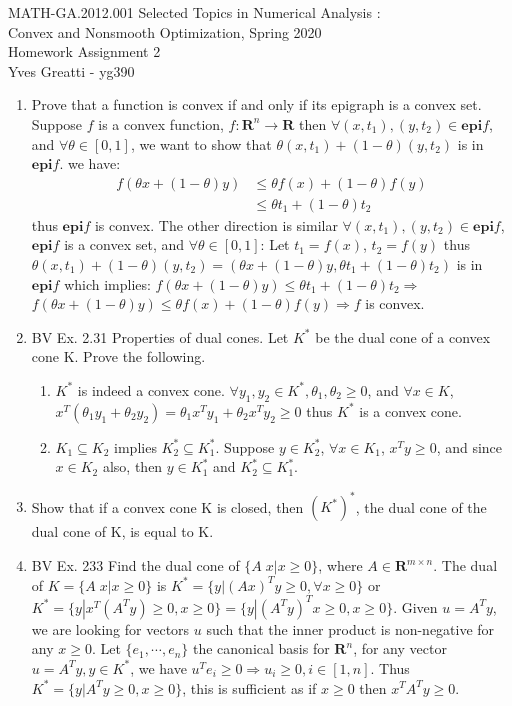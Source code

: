 \documentclass[10pt]{article}
\newcommand{\be}{\begin{enumerate}}
\newcommand{\ee}{\end{enumerate}}
\newcommand{\0}{\mat{0}}
\newcommand{\epi}{\textbf{epi}}
\begin{document}
\noindent MATH-GA.2012.001 Selected Topics in Numerical Analysis :\\
Convex and Nonsmooth Optimization, Spring 2020\\
Homework Assignment 2 \\
Yves Greatti - yg390\\

\begin{enumerate}

\item Prove that a function is convex if and only if its epigraph is a convex set. 
Suppose $f$ is a convex function, $f: \mathbf{R}^n \rightarrow \mathbf{R}$ then $\forall (x, t_1),(y, t_2) \in \epi f$, and $\forall  \theta \in [0, 1]$,
we want to show that $\theta (x, t_1) + (1-\theta) (y, t_2)$ is in $\epi f$.
we have:
\begin{align*}
	f(\theta x + (1-\theta) y)	&\le	\theta f(x) + (1 - \theta) f(y) \\
						&\le	\theta t_1 + (1 - \theta) t_2
\end{align*} thus $\epi f$ is convex. The other direction is similar  $\forall (x, t_1),(y, t_2) \in \epi f$, $\epi f$ is a convex set, and $\forall  \theta \in [0, 1]$:
Let $t_1 = f(x)$, $t_2 = f(y)$ thus $\theta (x, t_1) + (1-\theta) (y, t_2) = (\theta x + (1-\theta) y, \theta t_1 + (1-\theta) t_2)$ is in $\epi f$ which implies: 
$f(\theta x + (1-\theta) y) \le \theta t_1 + (1-\theta) t_2 \Rightarrow$  $f(\theta x + (1-\theta) y) \le \theta f(x) + (1-\theta) f(y) \Rightarrow f$ is convex.

\item BV Ex. 2.31 Properties of dual cones. Let $K^*$ be the dual cone of a convex cone K. Prove the following.
	\be 
		\item $K^*$  is indeed a convex cone.
		$\forall y_1, y_2  \in K^*, \theta_1, \theta_2 \ge 0$, and $\forall x \in K$, 
		$x^T (\theta_1 y_1 + \theta_2 y_2) = \theta_1 x^T y_1 + \theta_2 x^T y_2 \ge 0$ thus $K^*$ is a convex cone.
		
		\item $K_1 \subseteq K_2$ implies $K_2^* \subseteq K_1^*$.
		Suppose $y \in K_2^*$, $\forall x \in K_1$, $x^T y \ge 0$, and since $x \in K_2$ also, then $y \in K_1^*$ and $K_2^* \subseteq K_1^*$.
	\ee
	
\item Show that if a convex cone K is closed, then $(K^*)^*$, the dual cone of the dual cone of K, is equal to K.

\item BV Ex. 233 Find the dual cone of $\{ A \; x | x \ge 0 \}$, where $A \in \mathbf{R}^{m \times n}$. 
The dual of $K = \{ A \; x | x \ge 0 \}$ is $K^* = \{ y | (A x)^T y \ge 0, \forall x \ge 0 \}$ or $K^* = \{ y | x^T (A^T y) \ge 0,  x \ge 0 \} = \{ y | (A^T y)^T x \ge 0, x \ge 0 \}$. 
Given $u = A^T y$, we are looking for vectors $u$ such that the inner product is non-negative for any $x \ge 0$.
Let $\{e_1, \cdots  ,e_n\}$ the canonical basis for $\mathbf{R}^n$, for any vector $u = A^T y, y \in K^*$, we have $u^T e_i \ge 0 \Rightarrow u_i \ge 0, i \in [1,n]$.
Thus $K^* = \{ y | A^T y \ge 0, x \ge 0\}$, this is sufficient as if $ x\ge 0$ then $x^T  A^T y \ge 0$.
	

\end{enumerate}
\end{document}
